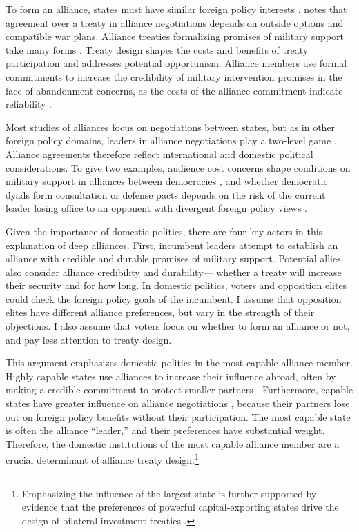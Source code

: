 \documentclass[12pt]{article}
\begin{document}
To form an alliance, states must have similar foreign policy interests \citep{Morrow1991, Smith1995, FordhamPoast2014}. 
\citet{Poast2019a} notes that agreement over a treaty in alliance negotiations depends on outside options and compatible war plans. 
Alliance treaties formalizing promises of military support take many forms \citep{Leedsetal2002, BensonClinton2016}. 
Treaty design shapes the costs and benefits of treaty participation and addresses potential opportunism.  
Alliance members use formal commitments to increase the credibility of military intervention promises in the face of abandonment concerns, as the costs of the alliance commitment indicate reliability \citep{Morrow2000}.


Most studies of alliances focus on negotiations between states, but as in other foreign policy domains, leaders in alliance negotiations play a two-level game \citep{Putnam1988}. 
Alliance agreements therefore reflect international and domestic political considerations. 
To give two examples, audience cost concerns shape conditions on military support in alliances between democracies \citep{Chibaetal2015, FjelstulReiter2019}, and whether democratic dyads form consultation or defense pacts depends on the risk of the current leader losing office to an opponent with divergent foreign policy views \citep{Mattes2012a}. 


Given the importance of domestic politics, there are four key actors in this explanation of deep alliances. 
First, incumbent leaders attempt to establish an alliance with credible and durable promises of military support. 
Potential allies also consider alliance credibility and durability--- whether a treaty will increase their security and for how long. 
In domestic politics, voters and opposition elites could check the foreign policy goals of the incumbent. 
I assume that opposition elites have different alliance preferences, but vary in the strength of their objections. 
I also assume that voters focus on whether to form an alliance or not, and pay less attention to treaty design.


This argument emphasizes domestic politics in the most capable alliance member. 
Highly capable states use alliances to increase their influence abroad, often by making a credible commitment to protect smaller partners \citep{Morrow1994}. 
Furthermore, capable states have greater influence on alliance negotiations \citep{Mattes2012}, because their partners lose out on foreign policy benefits without their participation.
The most capable state is often the alliance ``leader,'' and their preferences have substantial weight. 
Therefore, the domestic institutions of the most capable alliance member are a crucial determinant of alliance treaty design.\footnote{Emphasizing the influence of the largest state is further supported by evidence that the preferences of powerful capital-exporting states drive the design of bilateral investment treaties \citep{AlleePeinhardt2014}.} 
\end{document}
